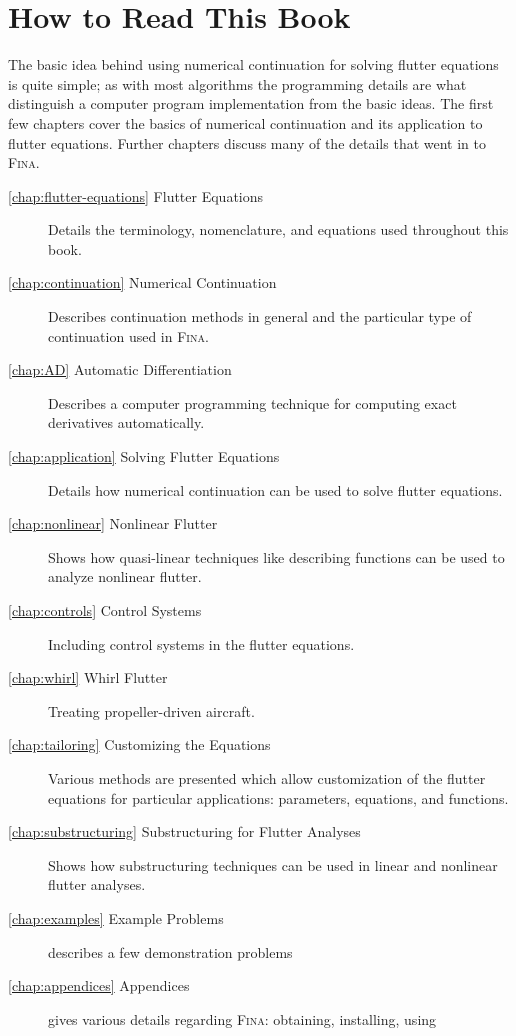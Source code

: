 \documentclass[10pt,openany,twoside]{book}
\numberwithin{equation}{section}   %
\newcommand{\Fina}{{\normalfont\scshape Fina\:}}
\begin{document}
\section{How to Read This Book}
The basic idea behind using numerical continuation for solving flutter
equations is quite simple; as with most algorithms the programming details
are  what distinguish a computer program implementation from the basic
ideas. The first few chapters cover the basics of numerical continuation
and its application to flutter equations. Further chapters discuss
many of the details that went in to \Fina.

\begin{description}
	\item[\ref{chap:flutter-equations} Flutter Equations]
	Details the terminology, nomenclature, and equations used
	throughout this book.

	\item[\ref{chap:continuation} Numerical Continuation]
	Describes continuation methods in general and the particular type
	of continuation used in \Fina.

	\item[\ref{chap:AD} Automatic Differentiation]
	Describes a computer programming technique for computing exact derivatives
	automatically.

	\item[\ref{chap:application} Solving Flutter Equations]
	Details how numerical continuation can be used to solve flutter equations.

	\item[\ref{chap:nonlinear} Nonlinear Flutter]
	Shows how quasi-linear techniques like describing functions
	can be used to analyze nonlinear flutter.

	\item[\ref{chap:controls} Control Systems] Including control systems in
			the flutter equations.

	\item[\ref{chap:whirl} Whirl Flutter] Treating propeller-driven aircraft.

	\item[\ref{chap:tailoring} Customizing the Equations]
	Various methods are presented which allow customization of the
	flutter equations for particular applications: parameters, equations,
	and functions.

	\item[\ref{chap:substructuring} Substructuring for Flutter Analyses]
	Shows how substructuring techniques can be used in linear and nonlinear
	flutter analyses.

	\item[\ref{chap:examples} Example Problems] describes a few demonstration problems

	\item[\ref{chap:appendices} Appendices] gives various details
		regarding \Fina: obtaining, installing, using
                
\end{description}
\end{document}
